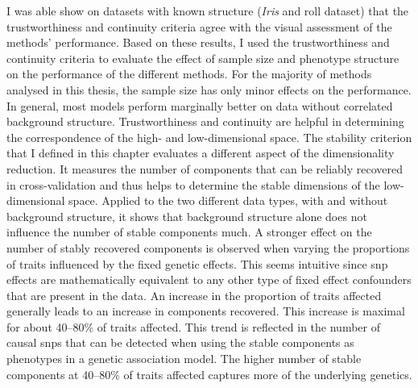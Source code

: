 I was able show on datasets with known structure (\textit{Iris} and roll dataset) that the trustworthiness and continuity criteria agree with the visual assessment of the methods' performance. Based on these results, I used the trustworthiness and continuity criteria to evaluate the effect of sample size and phenotype structure on the performance of the different methods. For the majority of methods analysed in this thesis, the sample size has only minor effects on the performance. In general, most models perform marginally better on data without correlated background structure. Trustworthiness and continuity are helpful in determining the correspondence of the high- and low-dimensional space. The stability criterion that I defined in this chapter evaluates a different aspect of the dimensionality reduction. It measures the number of components that can be reliably recovered in cross-validation and thus helps to determine the stable dimensions of the low-dimensional space. Applied to the two different data types, with and without background structure, it shows that background structure alone does not influence the number of stable components much. A stronger effect on the number of stably recovered components is observed when varying the proportions of traits influenced by the fixed genetic effects. This seems intuitive since \gls{snp} effects are mathematically equivalent to any other type of fixed effect confounders that are present in the data. An increase in the proportion of traits affected generally leads to an increase in components recovered. This increase is maximal for about \numrange{40}{80}\% of traits affected. This trend is reflected in the number of causal \glspl{snp} that can be detected when using the stable components as phenotypes in a genetic association model. The higher number of stable components at \numrange{40}{80}\% of traits affected captures more of the underlying genetics. 

